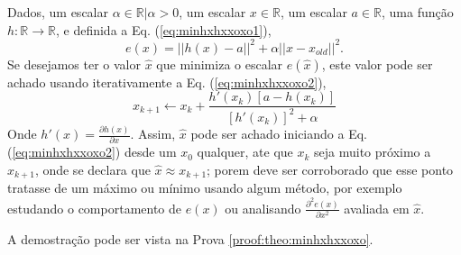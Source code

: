 \begin{theorem}\label{theo:minhxhxxoxo}
Dados,
um escalar $\alpha \in \mathbb{R} | \alpha > 0$, 
um escalar $x \in \mathbb{R}$, 
um escalar $a \in \mathbb{R}$,  
uma função $h:\mathbb{R} \rightarrow \mathbb{R}$, e 
definida a Eq. (\ref{eq:minhxhxxoxo1}),
\begin{equation}\label{eq:minhxhxxoxo1}
e(x)=||h(x)-a||^2+\alpha ||x-x_{old}||^2.
\end{equation}
Se desejamos ter o valor $\hat{x}$ que minimiza o escalar $e(\hat{x})$,
este valor pode ser achado usando iterativamente a Eq. (\ref{eq:minhxhxxoxo2}),
\begin{equation}\label{eq:minhxhxxoxo2}
x_{k+1} \leftarrow x_k+
\frac{ h'(x_k) \left[a-h(x_k)\right] }{\left[h'(x_k)\right]^2+\alpha}
\end{equation}
Onde  $h'(x)=\frac{\partial h(x)}{\partial x}$.
Assim, $\hat{x}$ pode ser achado iniciando a Eq. (\ref{eq:minhxhxxoxo2}) desde um $x_{0}$ qualquer, ate que $x_{k}$ seja muito próximo a $x_{k+1}$,
onde se declara que $\hat{x} \approx x_{k+1}$; porem deve ser corroborado
que esse ponto tratasse de um máximo ou mínimo usando algum método, por exemplo estudando o comportamento 
de $e(x)$ ou analisando  $\frac{\partial^2 e(x)}{\partial x^2}$ avaliada em $\hat{x}$.

\FALTAPROVA
A demostração pode ser vista na Prova \ref{proof:theo:minhxhxxoxo}.
\end{theorem}

